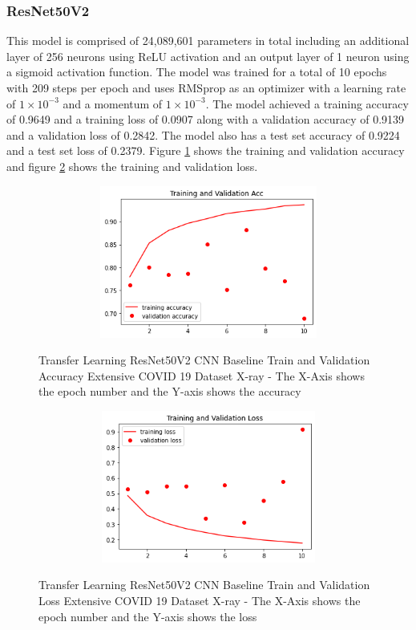 \subsubsection{ResNet50V2}
This model is comprised of 24,089,601 parameters in total including an additional layer of 256 neurons using ReLU activation and an output layer of 1 neuron using a sigmoid activation function.  The model was trained for a total of 10 epochs with 209 steps per epoch and uses RMSprop as an optimizer with a learning rate of $1\times10^{-3}$ and a momentum of $1\times10^{-3}$.  The model achieved a training accuracy of 0.9649 and a training loss of 0.0907 along with a validation accuracy of 0.9139 and a validation loss of 0.2842.  The model also has a test set accuracy of 0.9224 and a test set loss of 0.2379. Figure \ref{fig:ResNet50V2 CNN Baseline Train and Validation Accuracy Extensive COVID 19 Dataset X-ray} shows the training and validation accuracy and figure \ref{fig:ResNet50V2 CNN Baseline Train and Validation Loss Extensive COVID 19 Dataset X-ray} shows the training and validation loss.
 \begin{figure}[H]
    \centering
    \includegraphics[width=1\textwidth,height=5cm,keepaspectratio]{Images/ResNet50V2BaselineTrainingValidationAccuracyExtensiveXray.png}\\
    \caption{Transfer Learning ResNet50V2 CNN Baseline Train and Validation Accuracy Extensive COVID 19 Dataset X-ray - The X-Axis shows the epoch number and the Y-axis shows the accuracy}
    \label{fig:ResNet50V2 CNN Baseline Train and Validation Accuracy Extensive COVID 19 Dataset X-ray}
\end{figure}
 \begin{figure}[H]
    \centering   \includegraphics[width=1\textwidth,height=5cm,keepaspectratio]{Images/ResNet50V2BaselineTrainingValidationLossExtensiveXray.png}\\
    \caption{Transfer Learning ResNet50V2 CNN Baseline Train and Validation Loss Extensive COVID 19 Dataset X-ray - The X-Axis shows the epoch number and the Y-axis shows the loss}
    \label{fig:ResNet50V2 CNN Baseline Train and Validation Loss Extensive COVID 19 Dataset X-ray}
\end{figure}
